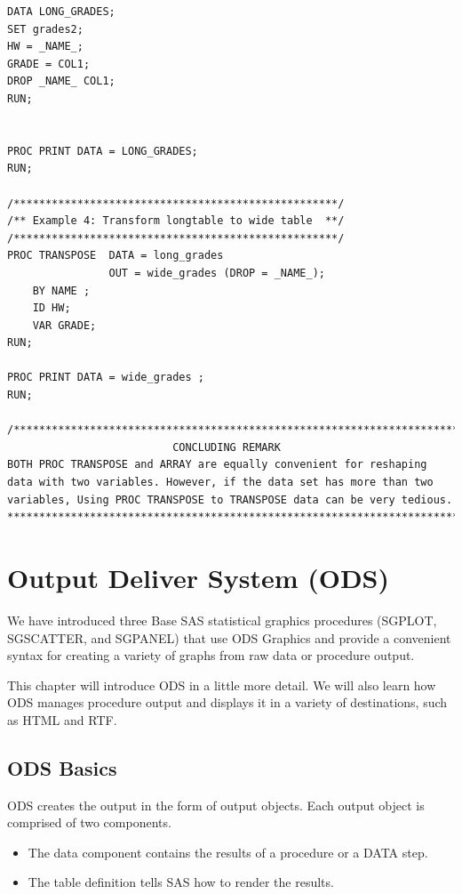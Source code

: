 \documentclass[
]{book}
\providecommand{\tightlist}{%
  \setlength{\itemsep}{0pt}\setlength{\parskip}{0pt}}
\begin{document}
\begin{verbatim}
DATA LONG_GRADES;
SET grades2; 
HW = _NAME_;
GRADE = COL1;
DROP _NAME_ COL1;
RUN;


PROC PRINT DATA = LONG_GRADES;
RUN;

/***************************************************/
/** Example 4: Transform longtable to wide table  **/
/***************************************************/
PROC TRANSPOSE  DATA = long_grades 
                OUT = wide_grades (DROP = _NAME_); 
    BY NAME ;
    ID HW;
    VAR GRADE;
RUN;

PROC PRINT DATA = wide_grades ;
RUN;

/************************************************************************
                          CONCLUDING REMARK 
BOTH PROC TRANSPOSE and ARRAY are equally convenient for reshaping 
data with two variables. However, if the data set has more than two 
variables, Using PROC TRANSPOSE to TRANSPOSE data can be very tedious. 
*************************************************************************/
\end{verbatim}

\hypertarget{output-deliver-system-ods}{%
\chapter{Output Deliver System (ODS)}\label{output-deliver-system-ods}}

We have introduced three Base SAS statistical graphics procedures (SGPLOT, SGSCATTER, and SGPANEL) that use ODS Graphics and provide a convenient syntax for creating a variety of graphs from raw data or procedure output.

This chapter will introduce ODS in a little more detail. We will also learn how ODS manages procedure output and displays it in a variety of destinations, such as HTML and RTF.

\hypertarget{ods-basics}{%
\section{ODS Basics}\label{ods-basics}}

ODS creates the output in the form of output objects. Each output object is comprised of two components.

\begin{itemize}
\tightlist
\item
  The data component contains the results of a procedure or a DATA step.
\item
  The table definition tells SAS how to render the results.
\end{itemize}
\end{document}

